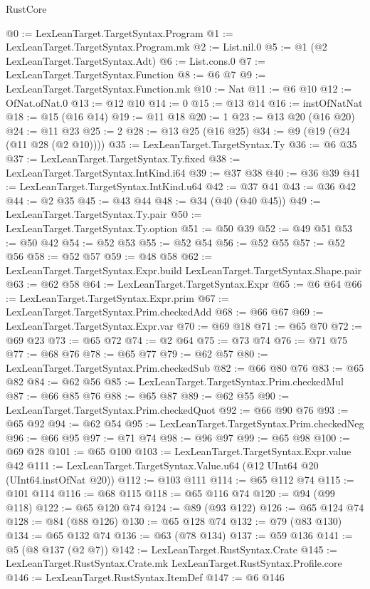 \begin{lexlean}{RustCore}
\begin{coremodule}
@0 := LexLeanTarget.TargetSyntax.Program
@1 := LexLeanTarget.TargetSyntax.Program.mk
@2 := List.nil.{0}
@5 := @1 (@2 LexLeanTarget.TargetSyntax.Adt)
@6 := List.cons.{0}
@7 := LexLeanTarget.TargetSyntax.Function
@8 := @6 @7
@9 := LexLeanTarget.TargetSyntax.Function.mk
@10 := Nat
@11 := @6 @10
@12 := OfNat.ofNat.{0}
@13 := @12 @10
@14 := 0
@15 := @13 @14
@16 := instOfNatNat
@18 := @15 (@16 @14)
@19 := @11 @18
@20 := 1
@23 := @13 @20 (@16 @20)
@24 := @11 @23
@25 := 2
@28 := @13 @25 (@16 @25)
@34 := @9 (@19 (@24 (@11 @28 (@2 @10))))
@35 := LexLeanTarget.TargetSyntax.Ty
@36 := @6 @35
@37 := LexLeanTarget.TargetSyntax.Ty.fixed
@38 := LexLeanTarget.TargetSyntax.IntKind.i64
@39 := @37 @38
@40 := @36 @39
@41 := LexLeanTarget.TargetSyntax.IntKind.u64
@42 := @37 @41
@43 := @36 @42
@44 := @2 @35
@45 := @43 @44
@48 := @34 (@40 (@40 @45))
@49 := LexLeanTarget.TargetSyntax.Ty.pair
@50 := LexLeanTarget.TargetSyntax.Ty.option
@51 := @50 @39
@52 := @49 @51
@53 := @50 @42
@54 := @52 @53
@55 := @52 @54
@56 := @52 @55
@57 := @52 @56
@58 := @52 @57
@59 := @48 @58
@62 := LexLeanTarget.TargetSyntax.Expr.build LexLeanTarget.TargetSyntax.Shape.pair
@63 := @62 @58
@64 := LexLeanTarget.TargetSyntax.Expr
@65 := @6 @64
@66 := LexLeanTarget.TargetSyntax.Expr.prim
@67 := LexLeanTarget.TargetSyntax.Prim.checkedAdd
@68 := @66 @67
@69 := LexLeanTarget.TargetSyntax.Expr.var
@70 := @69 @18
@71 := @65 @70
@72 := @69 @23
@73 := @65 @72
@74 := @2 @64
@75 := @73 @74
@76 := @71 @75
@77 := @68 @76
@78 := @65 @77
@79 := @62 @57
@80 := LexLeanTarget.TargetSyntax.Prim.checkedSub
@82 := @66 @80 @76
@83 := @65 @82
@84 := @62 @56
@85 := LexLeanTarget.TargetSyntax.Prim.checkedMul
@87 := @66 @85 @76
@88 := @65 @87
@89 := @62 @55
@90 := LexLeanTarget.TargetSyntax.Prim.checkedQuot
@92 := @66 @90 @76
@93 := @65 @92
@94 := @62 @54
@95 := LexLeanTarget.TargetSyntax.Prim.checkedNeg
@96 := @66 @95
@97 := @71 @74
@98 := @96 @97
@99 := @65 @98
@100 := @69 @28
@101 := @65 @100
@103 := LexLeanTarget.TargetSyntax.Expr.value @42
@111 := LexLeanTarget.TargetSyntax.Value.u64 (@12 UInt64 @20 (UInt64.instOfNat @20))
@112 := @103 @111
@114 := @65 @112 @74
@115 := @101 @114
@116 := @68 @115
@118 := @65 @116 @74
@120 := @94 (@99 @118)
@122 := @65 @120 @74
@124 := @89 (@93 @122)
@126 := @65 @124 @74
@128 := @84 (@88 @126)
@130 := @65 @128 @74
@132 := @79 (@83 @130)
@134 := @65 @132 @74
@136 := @63 (@78 @134)
@137 := @59 @136
@141 := @5 (@8 @137 (@2 @7))
@142 := LexLeanTarget.RustSyntax.Crate
@145 := LexLeanTarget.RustSyntax.Crate.mk LexLeanTarget.RustSyntax.Profile.core
@146 := LexLeanTarget.RustSyntax.ItemDef
@147 := @6 @146

\end{coremodule}
\end{lexlean}
